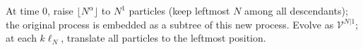 \small
At time $0$, raise $\lfloor N^\alpha\rfloor$ to $N^1$ particles
(keep leftmost $N$ among all descendants); the original process
is embedded as a subtree of this new process.
Evolve as $\mathcal V^{N|1}$; at each $k\ell_N$,
translate all particles to the leftmost position.
